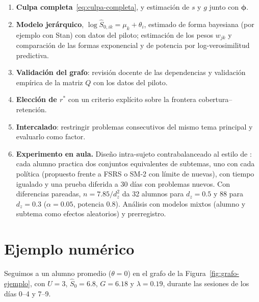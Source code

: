 \documentclass[11pt]{article}
\theoremstyle{definition}
\theoremstyle{remark}
\newcommand{\Sh}{\hat S}
\newcommand{\rstar}{r^{\ast}}
\begin{document}
\begin{enumerate}
\item \textbf{Culpa completa}~\eqref{eq:culpa-completa}, y estimación de $s$ y $g$ junto con $\bm\phi$.
\item \textbf{Modelo jerárquico}, $\log\Sh_{0,ik}=\mu_k+\theta_i$, estimado de forma bayesiana (por ejemplo con Stan) con datos del piloto; estimación de los pesos $w_{jk}$ y comparación de las formas exponencial y de potencia por log-verosimilitud predictiva.
\item \textbf{Validación del grafo}: revisión docente de las dependencias y validación empírica de la matriz $Q$ con los datos del piloto.
\item \textbf{Elección de $\rstar$} con un criterio explícito sobre la frontera cobertura--retención.
\item \textbf{Intercalado}: restringir problemas consecutivos del mismo tema principal y evaluarlo como factor.
\item \textbf{Experimento en aula.} Diseño intra-sujeto contrabalanceado al estilo de \citet{lindsey2014}: cada alumno practica dos conjuntos equivalentes de subtemas, uno con cada política (propuesto frente a FSRS o SM-2 con límite de nuevas), con tiempo igualado y una prueba diferida a 30 días con problemas nuevos. Con diferencias pareadas, $n=7.85/d_z^2$ da 32 alumnos para $d_z=0.5$ y 88 para $d_z=0.3$ ($\alpha=0.05$, potencia 0.8). Análisis con modelos mixtos (alumno y subtema como efectos aleatorios) y prerregistro.
\end{enumerate}

\appendix
\section{Ejemplo numérico}
\label{app:traza}

Seguimos a un alumno promedio ($\theta=0$) en el grafo de la Figura~\ref{fig:grafo-ejemplo}, con $U=3$, $\Sh_0=6.8$, $G=6.18$ y $\lambda=0.19$, durante las sesiones de los días 0--4 y 7--9.
\end{document}
